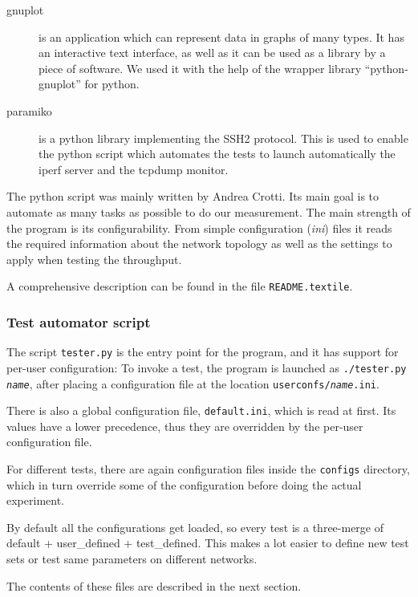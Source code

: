\begin{description}
	\item[gnuplot]
		is an application which can represent data in graphs of many types. It has an interactive text interface, as well as it can be used as a library by a piece of software. We used it with the help of the wrapper library ``python-gnuplot'' for python.

	\item[paramiko]
		is a python library implementing the SSH2 protocol.	
	This is used to enable the python script which automates the tests to launch automatically the iperf server and the tcpdump monitor.

\end{description}
%
The python script was mainly written by Andrea Crotti.  Its main goal is to
automate as many tasks as possible to do our measurement.  The main strength
of the program is its configurability.  From simple configuration ({\em ini})
files it reads the required information about the network topology as well as
the settings to apply when testing the throughput.

A comprehensive description can be found in the file {\tt README.textile}.


\subsubsection{Test automator script}

\noindent
The script \verb|tester.py| is the entry point for the program, and it has support for per-user configuration:
To invoke a test, the program is launched as {\tt ./tester.py \textit{name}},
after placing a configuration file at the location {\tt userconfs/\textit{name}.ini}.\newline

There is also a global configuration file, {\tt default.ini}, which is read at first.
Its values have a lower precedence, thus they are overridden by the per-user configuration file.

For different tests, there are again configuration files inside the {\tt configs} directory, which in turn override some of the configuration before doing the actual experiment.

By default all the configurations get loaded, so every test is a three-merge of default + user_defined + test_defined.\newline
This makes a lot easier to define new test sets or test same parameters on different networks.

The contents of these files are described in the next section.



